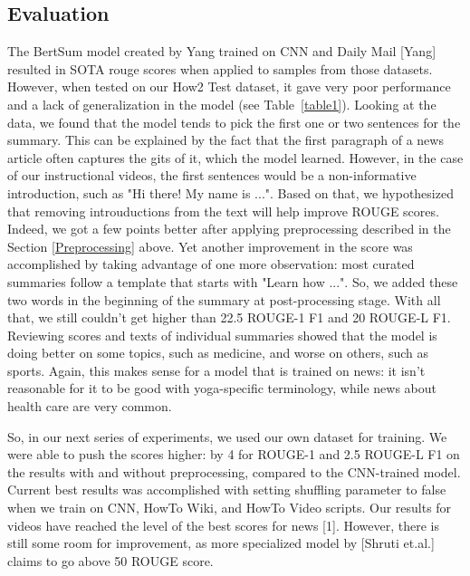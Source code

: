 \documentclass{article}
\begin{document}
\subsection{Evaluation}
The BertSum model created by Yang trained on CNN and Daily Mail [Yang] resulted in SOTA rouge scores when applied to samples from those datasets. However, when tested on our How2 Test dataset, it gave very poor performance and a lack of generalization in the model (see Table~\ref{table1}). Looking at the data, we found that the model tends to pick the first one or two sentences for the summary. This can be explained by the fact that the first paragraph of a news article often captures the gits of it, which the model learned. However, in the case of our instructional videos, the first sentences would be a non-informative introduction, such as "Hi there! My name is ...". Based on that, we hypothesized that removing introuductions from the text will help improve ROUGE scores. Indeed, we got a few points better after applying  preprocessing described in the Section \ref{Preprocessing} above. Yet another improvement in the score was accomplished by taking advantage of one more observation: most curated summaries follow a template that starts with "Learn how ...". So, we added these two words in the beginning of the summary at post-processing stage. With all that, we still couldn't get higher than 22.5 ROUGE-1 F1 and 20 ROUGE-L F1. Reviewing scores and texts of individual summaries showed that the model is doing better on some topics, such as medicine, and worse on others, such as sports. Again, this makes sense for a model that is trained on news: it isn't reasonable for it to be good with yoga-specific terminology, while news about health care are very common.

So, in our next series of experiments, we used our own dataset for training. We were able to push the scores higher: by 4 for ROUGE-1 and 2.5 ROUGE-L F1 on the results with and without preprocessing, compared to the CNN-trained model. Current best results was accomplished with setting shuffling parameter to false when we train on CNN, HowTo Wiki, and HowTo Video scripts. Our results for videos have reached the level of the best scores for news [1]. However, there is still some  room for improvement, as more specialized model by [Shruti et.al.] claims to go above 50 ROUGE score.
\end{document}
